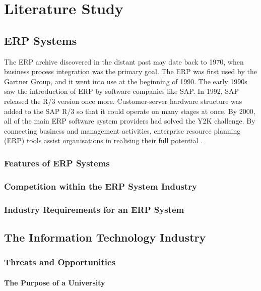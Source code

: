 \chapter{Literature Study}
\section{ERP Systems}
\par{The ERP archive discovered in the distant past may date back to 1970, when business process integration was the primary goal. The ERP was first used by the Gartner Group, and it went into use at the beginning of 1990. The early 1990s saw the introduction of ERP by software companies like SAP. In 1992, SAP released the R/3 version once more. Customer-server hardware structure was added to the SAP R/3 so that it could operate on many stages at once. By 2000, all of the main ERP software system providers had solved the Y2K challenge. By connecting business and management activities, enterprise resource planning (ERP) tools assist organisations in realising their full potential \citep{uccakturk2013effects}.}

\subsection{Features of ERP Systems}
\subsection{Competition within the ERP System Industry}
\subsection{Industry Requirements for an ERP System}
\section{The Information Technology Industry}
\subsection{Threats and Opportunities}
\subsubsection{The Purpose of a University}
